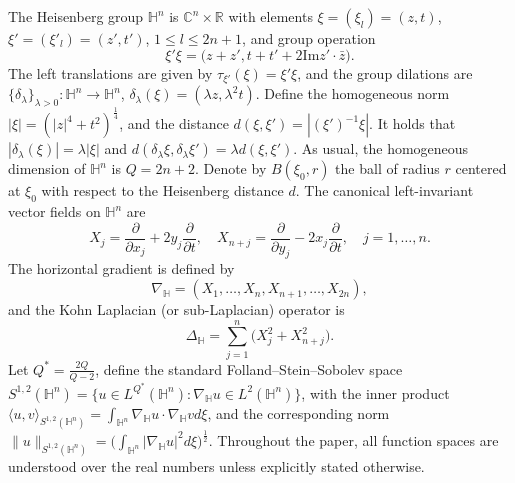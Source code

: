 \documentclass[11pt]{article}
\begin{document}
The Heisenberg group $\mathbb{H}^{n}$ is $\mathbb{C}^{n}\times\mathbb{R}$ with elements $\xi=(\xi_{l})=(z,t)$, $\xi'=(\xi'_{l})=(z',t')$, $1\leq l\leq 2n+1$, and group operation \[\xi'\xi=\big(z+z',t+t'+2\mathrm{Im}z'\cdot\bar{z}\big).\]
The left translations are given by $\tau_{\xi'}(\xi)=\xi'\xi$,
{and the group dilations are}
$\{\delta_{\lambda}\}_{\lambda>0}: \mathbb{H}^{n}\rightarrow\mathbb{H}^{n}$, $\delta_{\lambda}(\xi)=(\lambda z,\lambda^{2}t)$.
Define the homogeneous norm $|\xi|=(|z|^{4}+t^{2})^{\frac{1}{4}}$, and the distance
$d(\xi,\xi')=|(\xi')^{-1}\xi|$.
It holds that $|\delta_{\lambda}(\xi)|=\lambda|\xi|$ and
{$d(\delta_\lambda\xi,\delta_\lambda\xi')=\lambda d(\xi,\xi')$.}
As usual, the homogeneous dimension of $\mathbb{H}^{n}$ is $Q=2n+2$. Denote by $B(\xi_0,r)$ the ball of radius $r$ centered at $\xi_0$ with respect to the Heisenberg distance $d$.
The canonical left-invariant vector fields on $\mathbb{H}^{n}$ are
\begin{equation*}
 X_{j}=\frac{\partial }{\partial x_{j}}+2y_{j}\frac{\partial }{\partial t},\quad X_{n+j}=\frac{\partial}{\partial y_{j}}-2x_{j}\frac{\partial}{\partial t},\quad j=1, \ldots, n.
\end{equation*}
The horizontal gradient is defined by
\begin{equation*}
 \nabla_{\mathbb{H}}=(X_{1}, \ldots, X_{n},X_{n+1}, \ldots, X_{2n}),
\end{equation*}
and the Kohn Laplacian (or sub-Laplacian) operator is
\begin{equation*}
 \Delta_{\mathbb{H}}=\mathop{\sum}\limits_{j=1}^{n}\big(X_{j}^{2}+X_{n+j}^{2}\big).
\end{equation*}
Let $Q^{\ast}=\frac{2Q}{Q-2}$, define the standard Folland--Stein--Sobolev space $S^{1,2}(\mathbb{H}^{n})=\big\{u\in L^{Q^{\ast}}(\mathbb{H}^{n}):\nabla_{\mathbb{H}}u\in L^{2}(\mathbb{H}^{n})\big\}$,
with the inner product $\langle u,v\rangle_{S^{1,2}(\mathbb{H}^{n})}=\int_{\mathbb{H}^{n}}\nabla_{\mathbb{H}}u\cdot\nabla_{\mathbb{H}}v{d}\xi$,
and the corresponding norm $\|u\|_{S^{1,2}(\mathbb{H}^{n})}=\big(\int_{\mathbb{H}^{n}}|\nabla_{\mathbb{H}}u|^{2}{d}\xi\big)^{\frac{1}{2}}$.
Throughout the paper, all function spaces are understood over the real numbers unless explicitly stated otherwise.
\end{document}
